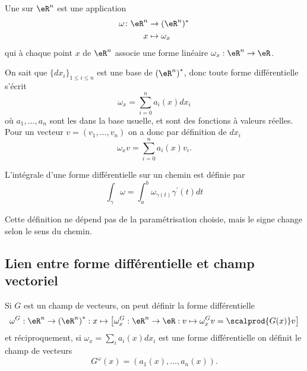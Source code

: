 Une  sur $\eR^n$ est une application
\begin{equation}
	\begin{aligned}
		\omega\colon \eR^n&\to (\eR^n)^* \\
		x&\mapsto \omega_x 
	\end{aligned}
\end{equation}
qui à chaque point $x$ de $\eR^n$ associe une forme linéaire $\omega_x: \eR^n \to \eR$.

On sait que $\{ d x_i \}_{1\leq i\leq n}$ est une base de
${(\eR^{n})}^{*}$, donc toute forme différentielle s'écrit
\begin{equation*}
  \omega_x = \sum_{i=0}^n a_i(x) d x_i
\end{equation*}
où $a_1,\ldots,a_n$ sont les  dans la
base usuelle, et sont des fonctions à valeurs réelles. Pour un vecteur
$v = (v_1,\ldots,v_n)$ on a donc par définition de $d x_i$
\begin{equation*}
  \omega_x v = \sum_{i=0}^n a_i(x) v_i.
\end{equation*}

L'intégrale d'une forme différentielle sur un chemin est définie par
\begin{equation*}
  \int_\gamma \omega = \int_a^b \omega_{\gamma(t)}\gamma^\prime(t) d t
\end{equation*}

\begin{remark}
  Cette définition ne dépend pas de la paramétrisation choisie, mais
  le signe change selon le sens du chemin.
\end{remark}

\subsection{Lien entre forme différentielle et champ vectoriel}
Si $G$ est un champ de vecteurs, on peut définir la forme différentielle
\begin{equation*}
  \omega^G : \eR^n \to {(\eR^n)}^\ast : x \mapsto \left\lbrack \omega^G_x :
  \eR^n \to \eR : v \mapsto \omega^G_x v = \scalprod {G(x)}v \right\rbrack
\end{equation*}
et réciproquement, si $\omega_x = \sum_i a_i(x)d x_i$ est une forme
différentielle on définit le champ de vecteurs
\begin{equation*}
  G^\omega(x) = (a_1(x),\ldots,a_n(x)).
\end{equation*}

